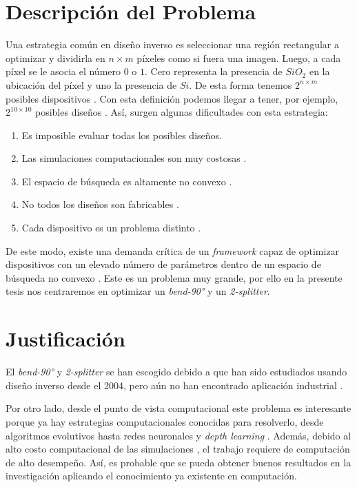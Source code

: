 \section{Descripción del  Problema}

Una estrategia común en diseño inverso es seleccionar una región rectangular a optimizar y dividirla en $n \times m$ 
  píxeles como si fuera una imagen. 
Luego, a cada píxel se le asocia el número $0$ o $1$. 
Cero representa la presencia de $SiO_2$ en la ubicación del píxel y uno la presencia de $Si$.
De esta forma tenemos $2^{n \times m}$ posibles dispositivos \citep{Su2020}. 
Con esta definición podemos llegar a tener, por ejemplo, $2^{10 \times 10}$ posibles diseños \citep{Malheiros-Silveira2020}.
Así, surgen algunas dificultades con esta estrategia:

\begin{enumerate}
  \item Es imposible evaluar todas los posibles diseños.
  \item Las simulaciones computacionales son muy costosas \citep{Kudyshev2020}.
  \item El espacio de búsqueda es altamente no convexo \citep{Su2018}.
  \item No todos los diseños son fabricables \citep{Su2020}.
  \item Cada dispositivo es un problema distinto \citep{Molesky2018}.
\end{enumerate}


De este modo, existe una demanda crítica de un \emph{framework} capaz de optimizar dispositivos con un elevado número de parámetros dentro de un espacio de búsqueda no convexo \citep{Kudyshev2020}. Este es un problema muy grande, por ello en la presente tesis nos centraremos en optimizar un \emph{bend-90°} y un \emph{2-splitter}.


\section{Justificación}

El \emph{bend-90°} y \emph{2-splitter} se han escogido debido a que han sido estudiados usando diseño inverso desde el 2004, pero aún no han encontrado aplicación industrial \citep{Molesky2018}. 

Por otro lado, desde el punto de vista computacional este problema es interesante porque ya hay estrategias computacionales conocidas para resolverlo, desde algoritmos evolutivos \citep{Hansen2016} hasta redes neuronales \citep{Goodfellow2015} y \emph{depth learning} \citep{Malkiel2018}. 
Además, debido al alto costo computacional de las simulaciones \citep{Schneider2019}, el trabajo requiere de computación de alto desempeño.
Así, es probable que se pueda obtener buenos resultados en la investigación aplicando el conocimiento ya existente en computación.

